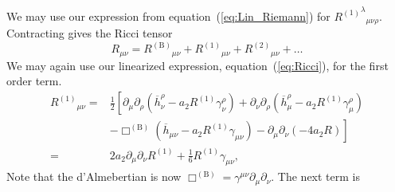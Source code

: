 \documentclass[a4paper, 11pt, titlepage, twoside]{report}
\newcommand{\eqnref}[1]{equation~(\ref{eq:#1})}
\newcommand{\recip}[1]{\ensuremath{\frac{1}{#1}}}
\begin{document}
We may use our expression from \eqnref{Lin_Riemann} for ${{R^{(1)}}^\lambda}_{\mu\nu\rho}$. Contracting gives the Ricci tensor
\begin{equation}
{R}_{\mu\nu} = {R^{(\mathrm{B})}}_{\mu\nu} + {R^{(1)}}_{\mu\nu} + {R^{(2)}}_{\mu\nu} + \ldots
\end{equation}
We may again use our linearized expression, \eqnref{Ricci}, for the first order term.
\begin{align}
{R^{(1)}}_{\mu\nu} = {} & \frac{1}{2}\left[\partial_\mu\partial_\rho \left(\overline{h}^\rho_\nu - a_2 R^{(1)}\gamma^\rho_\nu\right) + \partial_\nu\partial_\rho \left(\overline{h}^\rho_\mu - a_2 R^{(1)}\gamma^\rho_\mu\right) \right. \nonumber \\
 & - \left. \Box^{(\mathrm{B})} \left(\overline{h}_{\mu\nu} - a_2 R^{(1)}\gamma_{\mu\nu}\right) - \partial_\mu\partial_\nu \left(-4a_2 R\right)\right] \\ \nonumber
 = {} & 2 a_2\partial_\mu\partial_\nu R^{(1)} + \recip{6} R^{(1)}\gamma_{\mu\nu},
\end{align}
Note that the d'Almebertian is now $\Box^{(\mathrm{B})} = \gamma^{\mu\nu}\partial_\mu\partial_\nu$. The next term is
\end{document}
